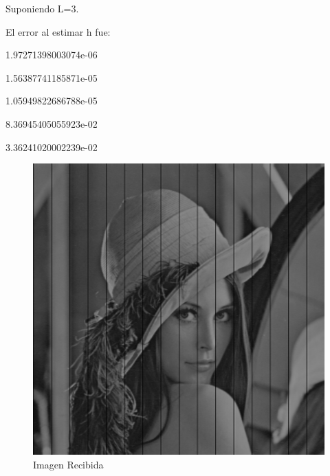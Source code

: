 \documentclass{article}
\begin{document}
\begin{multicols}{2}
\begin{figure}[H]
\end{figure}



\par \large{Suponiendo L=3.}
\par El error al estimar h fue:\\ 
\par   1.97271398003074e-06
\par   1.56387741185871e-05
\par   1.05949822686788e-05
\par   8.36945405055923e-02
\par   3.36241020002239e-02\\

\begin{figure}[H]
\centering
\includegraphics[scale=0.2]{../img/received_part4b.png}
\caption{Imagen Recibida}

\end{figure}


\end{multicols}
\end{document}
